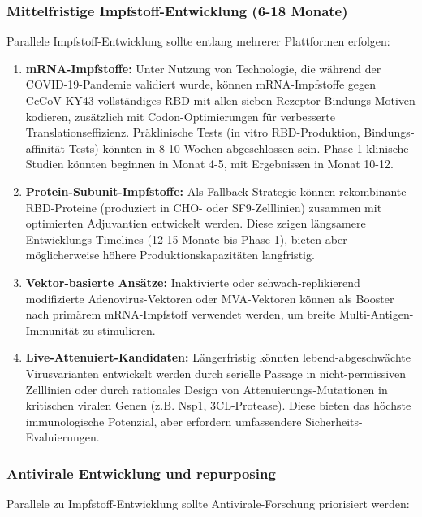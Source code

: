 \documentclass[11pt,a4paper]{article}
\theoremstyle{definition}
\begin{document}
\subsubsection{Mittelfristige Impfstoff-Entwicklung (6-18 Monate)}

Parallele Impfstoff-Entwicklung sollte entlang mehrerer Plattformen erfolgen:

\begin{enumerate}
\item \textbf{mRNA-Impfstoffe:} Unter Nutzung von Technologie, die während der COVID-19-Pandemie validiert wurde, können mRNA-Impfstoffe gegen CcCoV-KY43 vollständiges RBD mit allen sieben Rezeptor-Bindungs-Motiven kodieren, zusätzlich mit Codon-Optimierungen für verbesserte Translationseffizienz. Präklinische Tests (in vitro RBD-Produktion, Bindungs­affinität-Tests) könnten in 8-10 Wochen abgeschlossen sein. Phase 1 klinische Studien könnten beginnen in Monat 4-5, mit Ergebnissen in Monat 10-12.

\item \textbf{Protein-Subunit-Impfstoffe:} Als Fallback-Strategie können rekombinante RBD-Proteine (produziert in CHO- oder SF9-Zelllinien) zusammen mit optimierten Adjuvantien entwickelt werden. Diese zeigen längsamere Entwicklungs-Timelines (12-15 Monate bis Phase 1), bieten aber möglicherweise höhere Produktionskapazitäten langfristig.

\item \textbf{Vektor-basierte Ansätze:} Inaktivierte oder schwach-replikierend modifizierte Adenovirus-Vektoren oder MVA-Vektoren können als Booster nach primärem mRNA-Impfstoff verwendet werden, um breite Multi-Antigen-Immunität zu stimulieren.

\item \textbf{Live-Attenuiert-Kandidaten:} Längerfristig könnten lebend-abgeschwächte Virusvarianten entwickelt werden durch serielle Passage in nicht-permissiven Zelllinien oder durch rationales Design von Attenuierungs-Mutationen in kritischen viralen Genen (z.B. Nsp1, 3CL-Protease). Diese bieten das höchste immunologische Potenzial, aber erfordern umfassendere Sicherheits-Evaluierungen.
\end{enumerate}

\subsubsection{Antivirale Entwicklung und repurposing}

Parallele zu Impfstoff-Entwicklung sollte Antivirale-Forschung priorisiert werden:
\end{document}
